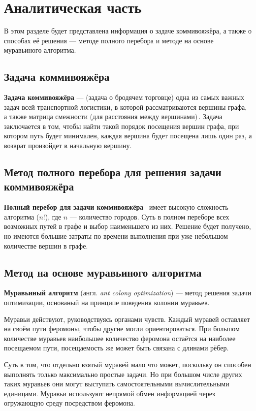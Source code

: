 \chapter{Аналитическая часть}
В этом разделе будет представлена информация о задаче коммивояжёра, а также о способах её решения  --- методе полного перебора и методе на основе муравьиного алгоритма.

\section{Задача коммивояжёра}
\textbf{Задача коммивояжёра}  --- (задача о бродячем торговце) одна из самых важных задач всей транспортной логистики, в которой рассматриваются вершины графа, а также матрица смежности (для расстояния между вершинами)\,\cite{task}. 
Задача заключается в том, чтобы найти такой порядок посещения вершин графа, при котором путь будет минимален, каждая вершина будет посещена лишь один раз, а возврат произойдет в начальную вершину. 

\section{Метод полного перебора для решения задачи коммивояжёра}

\textbf{Полный перебор для задачи коммивояжёра}~\cite{full-comb} имеет высокую сложность алгоритма ($n!$), где $n$ --- количество городов. 
Суть в полном переборе всех возможных путей в графе и выбор наименьшего из них. 
Решение будет получено, но имеются большие затраты по времени выполнения при уже небольшом количестве вершин в графе.


\section{Метод на основе муравьиного алгоритма}

\textbf{Муравьиный алгоритм} (англ. \textit{ant colony optimization})  \cite{full-comb} --- метод решения задачи оптимизации, основаный на принципе поведения колонии муравьев.

Муравьи действуют, руководствуясь органами чувств. 
Каждый муравей оставляет на своём пути феромоны, чтобы другие могли ориентироваться. 
При большом количестве муравьев наибольшее количество феромона остаётся на наиболее посещаемом пути, посещаемость же может быть связана с длинами рёбер.

Суть в том, что отдельно взятый муравей мало что может, поскольку он способен выполнять только максимально простые задачи. Но при большом числе других таких муравьев они могут выступать самостоятельными вычислительными единицами. Муравьи используют непрямой обмен информацией через огружающую среду посредством феромона.

